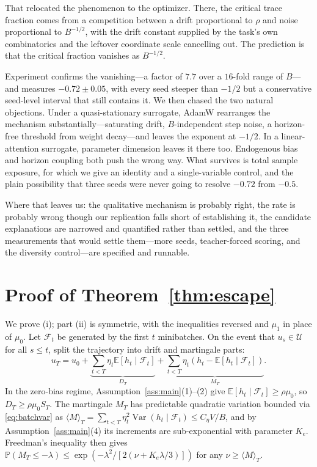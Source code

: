 \documentclass{article}
\theoremstyle{plain}
\theoremstyle{definition}
\theoremstyle{remark}
\newcommand{\E}{\mathbb{E}}
\newcommand{\Prob}{\mathbb{P}}
\newcommand{\Var}{\operatorname{Var}}
\newcommand{\1}{\mathbf{1}}
\newcommand{\cU}{\mathcal{U}}
\newcommand{\cF}{\mathcal{F}}
\begin{document}
That relocated the phenomenon to the optimizer. There, the critical trace
fraction comes from a competition between a drift proportional to $\rho$ and
noise proportional to $B^{-1/2}$, with the drift constant supplied by the task's
own combinatorics and the leftover coordinate scale cancelling out. The
prediction is that the critical fraction vanishes as $B^{-1/2}$.

Experiment confirms the vanishing---a factor of $7.7$ over a $16$-fold range of
$B$---and measures $-0.72\pm0.05$, with every seed steeper than $-1/2$ but a
conservative seed-level interval that still contains it. We then chased the two
natural objections. Under a quasi-stationary surrogate, AdamW rearranges the
mechanism substantially---saturating drift, $B$-independent step noise, a
horizon-free threshold from weight decay---and leaves the exponent at $-1/2$. In
a linear-attention surrogate, parameter dimension leaves it there too. Endogenous
bias and horizon coupling both push the wrong way. What survives is total sample
exposure, for which we give an identity and a single-variable control, and the
plain possibility that three seeds were never going to resolve $-0.72$ from
$-0.5$.

Where that leaves us: the qualitative mechanism is probably right, the rate is
probably wrong though our replication falls short of establishing it, the
candidate explanations are narrowed and quantified rather than settled, and the
three measurements that would settle them---more seeds, teacher-forced scoring,
and the diversity control---are specified and runnable.




\appendix

\section{Proof of Theorem~\ref{thm:escape}}
\label{app:escape}

We prove (i); part (ii) is symmetric, with the inequalities reversed and $\mu_1$
in place of $\mu_0$. Let $\cF_t$ be generated by the first $t$ minibatches. On
the event that $u_s\in\cU$ for all $s\le t$, split the trajectory into drift and
martingale parts:
\[
u_T = u_0 + \underbrace{\sum_{t<T}\eta_t\E[h_t\mid\cF_t]}_{D_T}
+ \underbrace{\sum_{t<T}\eta_t(h_t-\E[h_t\mid\cF_t])}_{M_T}.
\]
In the zero-bias regime, Assumption~\ref{ass:main}(1)--(2) give
$\E[h_t\mid\cF_t]\ge\rho\mu_0$, so $D_T\ge\rho\mu_0S_T$. The martingale $M_T$ has
predictable quadratic variation bounded via \eqref{eq:batchvar} as
$\langle M\rangle_T = \sum_{t<T}\eta_t^2\Var(h_t\mid\cF_t)\le C_\eta V/B$, and by
Assumption~\ref{ass:main}(4) its increments are sub-exponential with parameter
$K_e$. Freedman's inequality then gives
$\Prob(M_T\le-\lambda)\le\exp(-\lambda^2/[2(\nu+K_e\lambda/3)])$ for any
$\nu\ge\langle M\rangle_T$.
\end{document}
